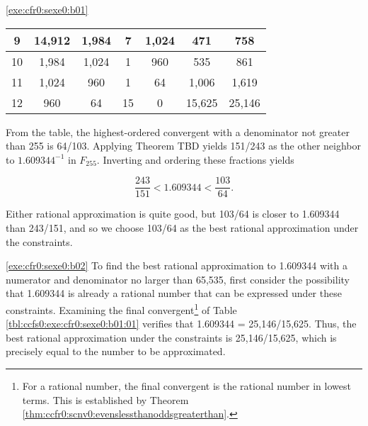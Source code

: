 \begin{vworkexercisesolution}{\ref{exe:cfr0:sexe0:b01}}
\begin{table}
\begin{center}
\begin{tabular}{|c|c|c|c|c|c|c|}
\hline
       \small{9}  &    \small{14,912}      &     \small{1,984}     &     \small{7}   &       \small{1,024}   &    \small{471} &     \small{758}  \\
\hline
      \small{10}  &     \small{1,984}      &     \small{1,024}     &     \small{1}   &         \small{960}   &    \small{535} &     \small{861}  \\
\hline
      \small{11}  &     \small{1,024}      &       \small{960}     &     \small{1}   &          \small{64}   &  \small{1,006} &   \small{1,619} \\
\hline
      \small{12}  &       \small{960}      &        \small{64}     &    \small{15}   &           \small{0}   & \small{15,625} &  \small{25,146} \\
\hline
\end{tabular}
\end{center}
\end{table}

From the table, the highest-ordered convergent with a denominator not greater
than 255 is 64/103.  Applying 
Theorem TBD
yields 151/243 as the other neighbor to 
$1.609344^{-1}$ in $F_{255}$.  Inverting and ordering these 
fractions yields

\begin{equation}
\frac{243}{151} < 1.609344 < \frac{103}{64}.
\end{equation}

Either rational approximation is quite good, but 103/64 is closer
to 1.609344 than 243/151, and so we choose 103/64 as the best
rational approximation under the constraints.
\end{vworkexercisesolution}
\vworkexerciseseparator
\begin{vworkexercisesolution}{\ref{exe:cfr0:sexe0:b02}}
To find the best rational approximation to 1.609344 with
a numerator and denominator no larger than 65,535, first consider the
possibility that 1.609344 is already a rational number that can
be expressed under these constraints.  Examining the final
convergent\footnote{For a rational number, the final convergent
is the rational number in lowest terms.  This is established
by Theorem \ref{thm:ccfr0:scnv0:evenslessthanoddsgreaterthan}.}
of Table \ref{tbl:ccfs0:exe:cfr0:sexe0:b01:01} verifies
that 1.609344 = 25,146/15,625.  Thus, the best rational 
approximation under
the constraints is 25,146/15,625, which is precisely equal to the
number to be approximated.
\end{vworkexercisesolution}
\vworkexercisechapterfooter



